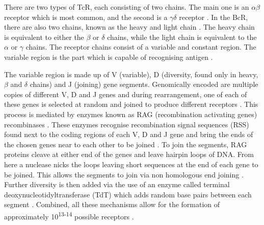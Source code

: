 There are two types of TcR, each consisting of two chains.
The main one is an $\alpha\beta$ receptor which is most common, and the second is a $\gamma\delta$ receptor \citep{Janeway2001}.
In the BcR, there are also two chains, known as the heavy and light chain \citep{Pieper2013}.
The heavy chain is equivalent to either the $\beta$ or $\delta$ chains, while the light chain is equivalent to the $\alpha$ or $\gamma$ chains.
The receptor chains consist of a variable and constant region.
The variable region is the part which is capable of recognising antigen \citep{Pieper2013}.

The variable region is made up of V (variable), D (diversity, found only in heavy, $\beta$ and $\delta$ chains) and J (joining) gene segments.
Genomically encoded are multiple copies of different V, D and J genes and during rearrangement, one of each of these genes is selected at random and joined to produce different receptors \citep{Fugmann2014}.
This process is mediated by enzymes known as RAG (recombination activating genes) recombinases \citep{Parkin2001}.
These enzymes recognise recombination signal sequences (RSS) found next to the coding regions of each V, D and J gene and bring the ends of the chosen genes near to each other to be joined \citep{Fugmann2014, Oettinger1999}.
To join the segments, RAG proteins cleave at either end of the genes and leave hairpin loops of DNA.
From here a nuclease nicks the loops leaving short sequences at the end of each gene to be joined.
This allows the segments to join via non homologous end joining \citep{Schatz2011}.
Further diversity is then added via the use of an enzyme called terminal deoxynucleotidyltransferase (TdT) which adds random base pairs between each segment \citep{Motea2010}. 
Combined, all these mechanisms allow for the formation of approximately 10\textsuperscript{13-14} possible receptors \citep{KubyImmunology, Motea2010}.







